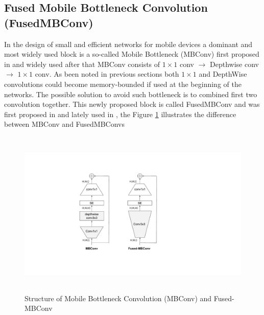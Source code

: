 \subsection{Fused Mobile Bottleneck Convolution (FusedMBConv)}

In the design of small and efficient networks for mobile devices a dominant and most widely used block is a so-called Mobile Bottleneck (MBConv) first proposed in \cite{howard2017_mobilenetv1} and widely used after that \cite{howard2019_searching_mobilenetv3} %
MBConv consists of $1 \times 1$ conv $\rightarrow$ Depthwise conv $\rightarrow$ $1\times 1$ conv. As been noted in previous sections both $1\times 1$ and DepthWise convolutions could become memory-bounded if used at the beginning of the networks. The possible solution to avoid such bottleneck is to combined first two convolution together. This newly proposed block is called FusedMBConv and was first proposed in \cite{li2021_searching} and lately used in \cite{tan2021_efficientnetv2}, the Figure \ref{fig:fusedmbconv} illustrates the difference between MBConv and FusedMBConvs

\begin{figure}[h!]
    \centering
        \includegraphics[clip, height=8cm]{images/fusedmbconv.pdf}
    \caption{Structure of Mobile Bottleneck Convolution (MBConv) and Fused-MBConv}
    \label{fig:fusedmbconv}
    \end{figure}







